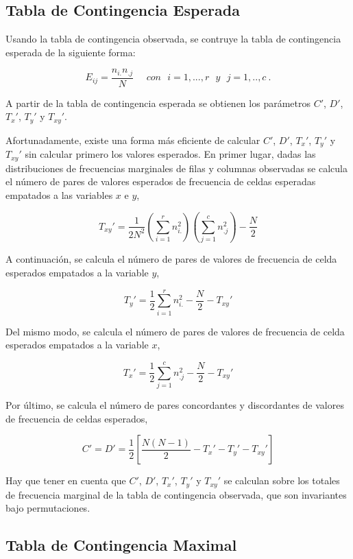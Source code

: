 \documentclass[12pt,a4paper,]{book}
\numberwithin{dummy}{section}
\theoremstyle{ocrenumbox}
\theoremstyle{blacknumex}
\theoremstyle{blacknumbox}
\theoremstyle{ocrenum}
\theoremstyle{ocrenum}
\begin{document}
\hypertarget{tabla-de-contingencia-esperada}{%
\subsection{Tabla de Contingencia
Esperada}\label{tabla-de-contingencia-esperada}}

Usando la tabla de contingencia observada, se contruye la tabla de
contingencia esperada de la siguiente forma:

\[
E_{ij}=\frac{n_{i.}n_{.j}}{N} ~~~~~~ con ~~~ i=1,...,r ~~~ y ~~~j=1,..,c~.
\]

A partir de la tabla de contingencia esperada se obtienen los parámetros
\(C'\), \(D'\), \(T_x'\), \(T_y'\) y \(T_{xy}'\).

Afortunadamente, existe una forma más eficiente de calcular \(C'\),
\(D'\), \(T_x'\), \(T_y'\) y \(T_{xy}'\) sin calcular primero los
valores esperados. En primer lugar, dadas las distribuciones de
frecuencias marginales de filas y columnas observadas se calcula el
número de pares de valores esperados de frecuencia de celdas esperadas
empatados a las variables \(x\) e \(y\),

\[
T_{xy}'=\frac{1}{2N^2}(\sum_{i=1}^rn_{i.}^2)(\sum_{j=1}^cn_{.j}^2)-\frac{N}{2}
\]

A continuación, se calcula el número de pares de valores de frecuencia
de celda esperados empatados a la variable \(y\),

\[
T_y'=\frac{1}{2}\sum_{i=1}^rn_{i.}^2-\frac{N}{2}-T_{xy}'
\]

Del mismo modo, se calcula el número de pares de valores de frecuencia
de celda esperados empatados a la variable \(x\),

\[
T_x'=\frac{1}{2}\sum_{j=1}^cn_{.j}^2-\frac{N}{2}-T_{xy}'
\]

Por último, se calcula el número de pares concordantes y discordantes de
valores de frecuencia de celdas esperados,

\[
C'=D'=\frac{1}{2}[\frac{N(N-1)}{2}-T_x'-T_y'-T_{xy}']
\]

Hay que tener en cuenta que \(C'\), \(D'\), \(T_x'\), \(T_y'\) y
\(T_{xy}'\) se calculan sobre los totales de frecuencia marginal de la
tabla de contingencia observada, que son invariantes bajo permutaciones.

\hypertarget{tabla-de-contingencia-maximal}{%
\subsection{Tabla de Contingencia
Maximal}\label{tabla-de-contingencia-maximal}}
\end{document}

